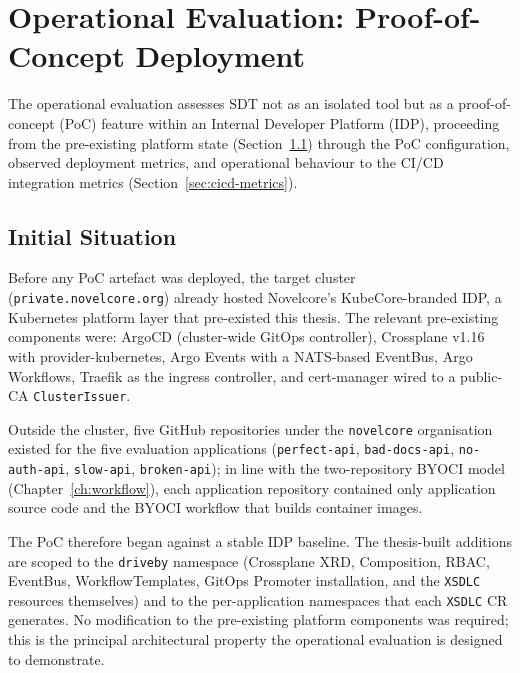 \section{Operational Evaluation: Proof-of-Concept Deployment}
\label{sec:operational-eval}

The operational evaluation assesses SDT not as an isolated tool but as a proof-of-concept (PoC) feature within an Internal Developer Platform (IDP), proceeding from the pre-existing platform state (Section~\ref{subsec:operational-initial-state}) through the PoC configuration, observed deployment metrics, and operational behaviour to the CI/CD integration metrics (Section~\ref{sec:cicd-metrics}).

\subsection{Initial Situation}
\label{subsec:operational-initial-state}

Before any PoC artefact was deployed, the target cluster (\texttt{private.\allowbreak novelcore.\allowbreak org}) already hosted Novelcore's KubeCore-branded IDP, a Kubernetes platform layer that pre-existed this thesis. The relevant pre-existing components were: ArgoCD (cluster-wide GitOps controller), Crossplane v1.16 with provider-kubernetes, Argo Events with a NATS-based EventBus, Argo Workflows, Traefik as the ingress controller, and cert-manager wired to a public-CA \texttt{ClusterIssuer}.

Outside the cluster, five GitHub repositories under the \texttt{novelcore} organisation existed for the five evaluation applications (\texttt{perfect-api}, \texttt{bad-docs-api}, \texttt{no-auth-api}, \texttt{slow-api}, \texttt{broken-api}); in line with the two-repository BYOCI model (Chapter~\ref{ch:workflow}), each application repository contained only application source code and the BYOCI workflow that builds container images.

The PoC therefore began against a stable IDP baseline. The thesis-built additions are scoped to the \texttt{driveby} namespace (Crossplane XRD, Composition, RBAC, EventBus, WorkflowTemplates, GitOps Promoter installation, and the \texttt{XSDLC} resources themselves) and to the per-application namespaces that each \texttt{XSDLC} CR generates. No modification to the pre-existing platform components was required; this is the principal architectural property the operational evaluation is designed to demonstrate.

